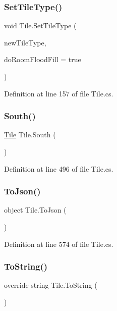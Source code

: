 \subsubsection{\texorpdfstring{Set\+Tile\+Type()}{SetTileType()}}
{\footnotesize\ttfamily void Tile.\+Set\+Tile\+Type (\begin{DoxyParamCaption}\item[{\hyperlink{class_tile_type}{Tile\+Type}}]{new\+Tile\+Type,  }\item[{bool}]{do\+Room\+Flood\+Fill = {\ttfamily true} }\end{DoxyParamCaption})}



Definition at line 157 of file Tile.\+cs.

\mbox{\label{class_tile_aa0e869284f94317f4f5231a239b7b4b1}} 
\subsubsection{\texorpdfstring{South()}{South()}}
{\footnotesize\ttfamily \hyperlink{class_tile}{Tile} Tile.\+South (\begin{DoxyParamCaption}{ }\end{DoxyParamCaption})}



Definition at line 496 of file Tile.\+cs.

\mbox{\label{class_tile_a852cc14213c5a329e0d70eedd22f023a}} 
\subsubsection{\texorpdfstring{To\+Json()}{ToJson()}}
{\footnotesize\ttfamily object Tile.\+To\+Json (\begin{DoxyParamCaption}{ }\end{DoxyParamCaption})}



Definition at line 574 of file Tile.\+cs.

\mbox{\label{class_tile_a0aa5ac04f01031e9cdfd9ae9abcb75bd}} 
\subsubsection{\texorpdfstring{To\+String()}{ToString()}}
{\footnotesize\ttfamily override string Tile.\+To\+String (\begin{DoxyParamCaption}{ }\end{DoxyParamCaption})}



